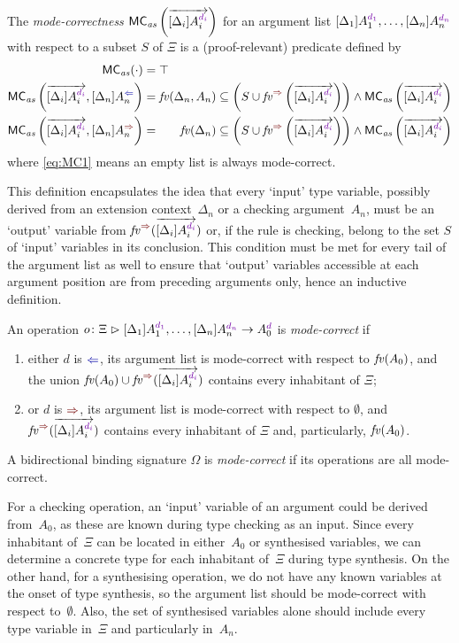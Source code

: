 \begin{definition}\label{def:mode-correctness-args}
  The \emph{mode-correctness} $\MCas\left(\biargvec\right)$ for an argument list $\biargs$ with respect to a subset $S$ of $\Xi$ is a (proof-relevant) predicate defined by 
  \begin{align}
    \label{eq:MC1} \MCas( \cdot ) & = \top \\
    \label{eq:MC3} \MCas\left(\biargvec, \chkbiarg[n]\right)
                                  & = \fv(\Delta_n, A_n) \subseteq \left( S \cup \synvar\left(\biargvec\right)\right) \land \MCas\left(\biargvec\right) \\
    \label{eq:MC2} \MCas\left(\biargvec, \synbiarg[n]\right) 
                                  & = \phantom{, A_n} \fv(\Delta_n) \subseteq \left( S \cup \synvar\left(\biargvec\right)\right) \land  \MCas\left(\biargvec\right)
  \end{align}
  where \eqref{eq:MC1} means an empty list is always mode-correct.
\end{definition}
This definition encapsulates the idea that every `input' type variable, possibly derived from an extension context~$\Delta_n$ or a checking argument~$A_n$, must be an `output' variable from $\synvar(\biargvec)$ or, if the rule is checking, belong to the set $S$ of `input' variables in its conclusion.
This condition must be met for every tail of the argument list as well to ensure that `output' variables accessible at each argument position are from preceding arguments only, hence an inductive definition.
\begin{definition}\label{def:mode-correctness}
  An operation $\biop$ is \emph{mode-correct} if 
  \begin{enumerate}
    \item either $d$ is $\chk$, its argument list is mode-correct with respect to $\mathit{fv}(A_0)$, and the union $\fv(A_0) \cup \synvar(\biargvec)$ contains every inhabitant of $\Xi$;
    \item or $d$ is $\syn$, its argument list is mode-correct with respect to $\emptyset$, and $\synvar(\biargvec)$ contains every inhabitant of $\Xi$ and, particularly, $\mathit{fv}(A_0)$.
  \end{enumerate}
  A bidirectional binding signature $\Omega$ is \emph{mode-correct} if its operations are all mode-correct.
\end{definition}
For a checking operation, an `input' variable of an argument could be derived from~$A_0$, as these are known during type checking as an input.
Since every inhabitant of~$\Xi$ can be located in either~$A_0$ or synthesised variables, we can determine a concrete type for each inhabitant of~$\Xi$ during type synthesis.
On the other hand, for a synthesising operation, we do not have any known variables at the onset of type synthesis, so the argument list should be mode-correct with respect to~$\emptyset$.
Also, the set of synthesised variables alone should include every type variable in~$\Xi$ and particularly in~$A_n$.

